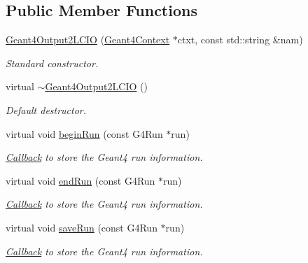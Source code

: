 \subsection*{Public Member Functions}
\begin{DoxyCompactItemize}
\item 
\hyperlink{class_d_d4hep_1_1_simulation_1_1_geant4_output2_l_c_i_o_ad8de2b534bab1a13d694cb8fc48103f3}{Geant4Output2LCIO} (\hyperlink{class_d_d4hep_1_1_simulation_1_1_geant4_context}{Geant4Context} $\ast$ctxt, const std::string \&nam)
\begin{DoxyCompactList}\small\item\em Standard constructor. \item\end{DoxyCompactList}\item 
virtual \hyperlink{class_d_d4hep_1_1_simulation_1_1_geant4_output2_l_c_i_o_a7d9a334e6ba95f422f8ecf97c0593fa6}{$\sim$Geant4Output2LCIO} ()
\begin{DoxyCompactList}\small\item\em Default destructor. \item\end{DoxyCompactList}\item 
virtual void \hyperlink{class_d_d4hep_1_1_simulation_1_1_geant4_output2_l_c_i_o_aebca66a953f5c24b0098b5066fe4c3fc}{beginRun} (const G4Run $\ast$run)
\begin{DoxyCompactList}\small\item\em \hyperlink{class_d_d4hep_1_1_callback}{Callback} to store the Geant4 run information. \item\end{DoxyCompactList}\item 
virtual void \hyperlink{class_d_d4hep_1_1_simulation_1_1_geant4_output2_l_c_i_o_a9365b2b05b745a7807ce06163a7977fb}{endRun} (const G4Run $\ast$run)
\begin{DoxyCompactList}\small\item\em \hyperlink{class_d_d4hep_1_1_callback}{Callback} to store the Geant4 run information. \item\end{DoxyCompactList}\item 
virtual void \hyperlink{class_d_d4hep_1_1_simulation_1_1_geant4_output2_l_c_i_o_a0fa2240decba857840eed494d6349f5f}{saveRun} (const G4Run $\ast$run)
\begin{DoxyCompactList}\small\item\em \hyperlink{class_d_d4hep_1_1_callback}{Callback} to store the Geant4 run information. \item\end{DoxyCompactList}\item 

\end{DoxyCompactItemize}
